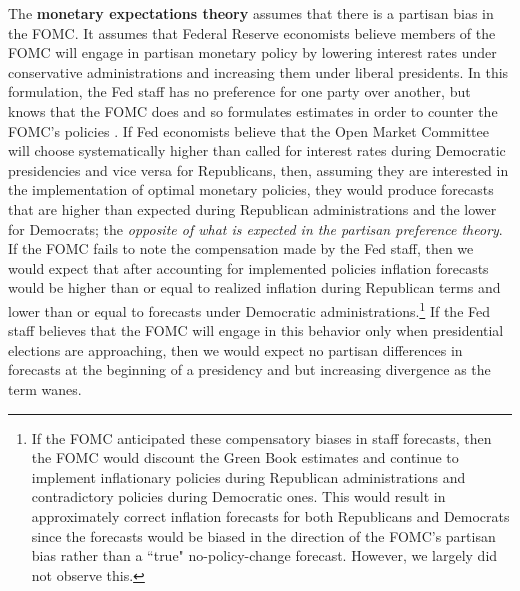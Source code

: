 \documentclass[a4paper]{article}\usepackage{graphicx, color}
\begin{document}
The {\bf{monetary expectations theory}} assumes that there is a partisan bias in the FOMC. It assumes that Federal Reserve economists believe members of the FOMC will engage in partisan monetary policy by lowering interest rates under conservative administrations and increasing them under liberal presidents. In this formulation, the Fed staff has no preference for one party over another, but knows that the FOMC does and so formulates estimates in order to counter the FOMC's policies \citep{Clark2012}. If Fed economists believe that the Open Market Committee will choose systematically higher than called for interest rates during Democratic presidencies and vice versa for Republicans, then, assuming they are interested in the implementation of optimal monetary policies, they would produce forecasts that are higher than expected during Republican administrations and the lower for Democrats; the {\emph{opposite of what is expected in the partisan preference theory}}. If the FOMC fails to note the compensation made by the Fed staff, then we would expect that after accounting for implemented policies inflation forecasts would be higher than or equal to realized inflation during Republican terms and lower than or equal to forecasts under Democratic administrations.\footnote{If the FOMC anticipated these compensatory biases in staff forecasts, then the FOMC would discount the Green Book estimates and continue to implement inflationary policies during Republican administrations and contradictory policies during Democratic ones. This would result in approximately correct inflation forecasts for both Republicans and Democrats since the forecasts would be biased in the direction of the FOMC's partisan bias rather than a ``true" no-policy-change forecast. However, we largely did not observe this.} If the Fed staff believes that the FOMC will engage in this behavior only when presidential elections are approaching, then we would expect no partisan differences in forecasts at the beginning of a presidency and but increasing divergence as the term wanes.%
 
\end{document}
